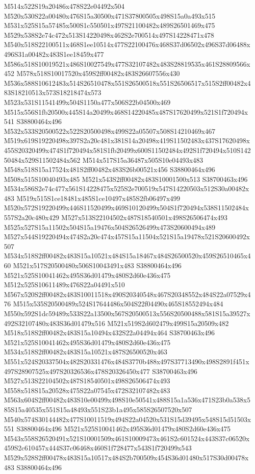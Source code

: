 \documentclass{article}
\begin{document}
\begin{multicols}{2}
M514x522S19a20486x478S22e04492x504 M520x530S22a00480x476S15a30500x471S37800505x498S15a0a493x515 M531x525S15a57485x500S1c550501x497S21100482x489S26501469x475 M529x538S2e74c472x513S14220498x462S2e700514x497S14228471x478 M540x518S22100511x468S1ee10514x477S22100476x468S37d06502x496S37d06488x496S31a00482x483S1ee18459x477 M586x518S10019521x486S10027549x477S32107482x483S28819535x461S28809566x452 M578x518S10017520x459S2ff00482x483S26607556x430 M536x588S10612483x514S26510478x551S26500518x551S26506517x515S2ff00482x483S18210513x573S18218474x573 M523x531S11541499x504S1150a477x506S22b04500x469 M515x556S1fb20500x445S14a20499x468S14220485x487S17620499x521S1f720494x541 S38800464x496 M532x533S20500522x522S20500498x499S22a05507x508S14210469x467 M519x619S19220498x397S2a20c481x381S14a20498x419S11502483x437S17620498x455S20320499x474S1f720494x581S1fb20499x600S11502484x492S1f720494x510S14250484x529S11502484x562 M514x517S15a36487x505S10e04493x483 M548x518S15a17524x481S2ff00482x483S26b00521x456 S38800464x496 M508x515S10040493x485 M521x543S2ff00482x483S10001500x513 S38700463x496 M534x586S2e74c477x561S14228475x525S2e700519x547S14220503x512S30a00482x483 M519x515S1ce18481x485S1ce10497x485S2fb06497x499 M520x572S19220499x446S11520499x469S10120499x504S1f720494x538S11502484x557S2a20c480x429 M527x513S22104502x487S18540501x498S26506474x493 M525x527S15a11502x504S15a19476x504S26526499x473S20600494x489 M527x544S19220494x474S2a20c474x457S15a11504x521S15a19478x521S20600492x507 M534x518S2ff00482x483S15a10521x484S15a18467x484S26500520x459S26510465x460 M521x517S20500480x506S10043491x483 S38800464x496 M521x525S10041462x495S36d01479x480S2d60e436x475 M512x525S10611489x476S22a04491x510 M567x520S2ff00482x483S10011518x490S20340548x467S20348552x484S22a07529x476 M515x535S20500489x524S17644486x504S22f04490x465S18552494x484 M550x592S1dc59489x533S22a13500x567S20500513x556S20500488x581S15a39527x492S32107480x483S36d01479x516 M521x519S2d602479x499S15a20509x482 M518x518S2ff00482x483S15a10494x432S22a04494x464 S38700463x496 M521x525S10041462x495S36d01479x480S2d60e436x475 M534x518S2ff00482x483S15a10521x487S26500520x463 M551x524S20337504x482S20331476x484S3770b488x497S37713490x498S2891f451x497S28907525x497S20326536x478S20326450x477 S38700463x496 M527x513S22104502x487S18540501x498S26506474x493 M558x518S15a20528x475S22a07545x472S32107482x483 M563x604S2ff00482x483S10e00499x498S10e50541x488S15a1a536x471S23b0a538x585S15a40535x551S15a48493x551S23b1a495x585S26507520x507 M540x574S30144482x477S10011519x494S22a04520x531S15d39495x548S15d51503x551 S38800464x496 M521x525S10041462x495S36d01479x480S2d60e436x475 M543x558S26520491x521S10001509x461S10009473x461S2c601524x443S37c06520x459S2c610457x444S37c06468x460S1f728477x543S1f720499x543 M529x528S2ff00478x483S15a10517x484S2b700509x454S36d01480x517S30d00478x483 S38800464x496


\end{multicols}
\end{document}
